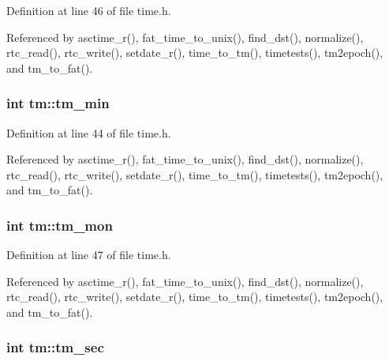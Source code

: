 Definition at line 46 of file time.\+h.



Referenced by asctime\+\_\+r(), fat\+\_\+time\+\_\+to\+\_\+unix(), find\+\_\+dst(), normalize(), rtc\+\_\+read(), rtc\+\_\+write(), setdate\+\_\+r(), time\+\_\+to\+\_\+tm(), timetests(), tm2epoch(), and tm\+\_\+to\+\_\+fat().

\subsubsection[{\texorpdfstring{tm\+\_\+min}{tm_min}}]{\setlength{\rightskip}{0pt plus 5cm}int tm\+::tm\+\_\+min}\hypertarget{structtm_af414eb7c86cc3099595211eee4d4211b}{}\label{structtm_af414eb7c86cc3099595211eee4d4211b}


Definition at line 44 of file time.\+h.



Referenced by asctime\+\_\+r(), fat\+\_\+time\+\_\+to\+\_\+unix(), find\+\_\+dst(), normalize(), rtc\+\_\+read(), rtc\+\_\+write(), setdate\+\_\+r(), time\+\_\+to\+\_\+tm(), timetests(), tm2epoch(), and tm\+\_\+to\+\_\+fat().

\subsubsection[{\texorpdfstring{tm\+\_\+mon}{tm_mon}}]{\setlength{\rightskip}{0pt plus 5cm}int tm\+::tm\+\_\+mon}\hypertarget{structtm_a112ac36fa2f593777138a417cf031e17}{}\label{structtm_a112ac36fa2f593777138a417cf031e17}


Definition at line 47 of file time.\+h.



Referenced by asctime\+\_\+r(), fat\+\_\+time\+\_\+to\+\_\+unix(), find\+\_\+dst(), normalize(), rtc\+\_\+read(), rtc\+\_\+write(), setdate\+\_\+r(), time\+\_\+to\+\_\+tm(), timetests(), tm2epoch(), and tm\+\_\+to\+\_\+fat().

\subsubsection[{\texorpdfstring{tm\+\_\+sec}{tm_sec}}]{\setlength{\rightskip}{0pt plus 5cm}int tm\+::tm\+\_\+sec}\hypertarget{structtm_a4d098a9a5c03a00b2ee61e10851de81e}{}\label{structtm_a4d098a9a5c03a00b2ee61e10851de81e}


